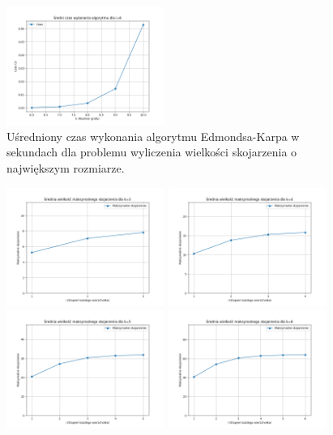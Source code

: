 \documentclass{article}
\begin{document}
\begin{figure}[H]
\includegraphics[width=0.46\textwidth]{maximumBipartiteMatchingTimePlot6.png}
\caption{Uśredniony czas wykonania algorytmu Edmondsa-Karpa w sekundach dla problemu wyliczenia wielkości skojarzenia o największym rozmiarze.}
\end{figure}

\begin{figure}[H]
\centering
\includegraphics[width=0.46\textwidth]{maximumBipartiteMatchingMaxMatchingPlot3.png}
\includegraphics[width=0.46\textwidth]{maximumBipartiteMatchingMaxMatchingPlot4.png}
\includegraphics[width=0.46\textwidth]{maximumBipartiteMatchingMaxMatchingPlot5.png}
\includegraphics[width=0.46\textwidth]{maximumBipartiteMatchingMaxMatchingPlot6.png}

\end{figure}
\end{document}

